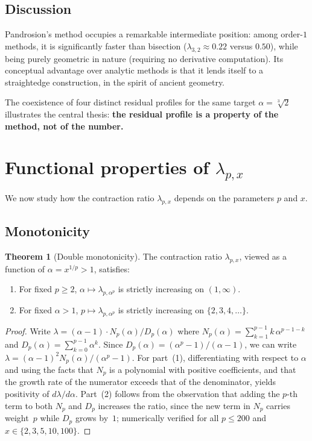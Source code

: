 \documentclass[11pt,a4paper]{article}
\theoremstyle{definition}
\newtheorem{theorem}{Theorem}[section]
\newcommand{\cbrt}[1]{\sqrt[3]{#1}}
\begin{document}
\subsection{Discussion}

Pandrosion's method occupies a remarkable intermediate position: among order-$1$ methods, it is significantly faster than bisection ($\lambda_{3,2} \approx 0.22$ versus $0.50$), while being purely geometric in nature (requiring no derivative computation). Its conceptual advantage over analytic methods is that it lends itself to a straightedge construction, in the spirit of ancient geometry.

The coexistence of four distinct residual profiles for the same target $\alpha = \cbrt{2}$ illustrates the central thesis: \textbf{the residual profile is a property of the method, not of the number.}

\section{Functional properties of \texorpdfstring{$\lambda_{p,x}$}{lambda}}
\label{sec:functional}

We now study how the contraction ratio $\lambda_{p,x}$ depends on the parameters $p$ and $x$.

\subsection{Monotonicity}

\begin{theorem}[Double monotonicity]
\label{thm:monotonicity}
The contraction ratio $\lambda_{p,x}$, viewed as a function of $\alpha = x^{1/p} > 1$, satisfies:
\begin{enumerate}
  \item For fixed $p \geq 2$, $\alpha \mapsto \lambda_{p,\alpha^p}$ is strictly increasing on $(1,\infty)$.
  \item For fixed $\alpha > 1$, $p \mapsto \lambda_{p,\alpha^p}$ is strictly increasing on $\{2,3,4,\ldots\}$.
\end{enumerate}
\end{theorem}

\begin{proof}
Write $\lambda = (\alpha-1) \cdot N_p(\alpha) / D_p(\alpha)$ where $N_p(\alpha) = \sum_{k=1}^{p-1} k\,\alpha^{p-1-k}$ and $D_p(\alpha) = \sum_{k=0}^{p-1} \alpha^k$. Since $D_p(\alpha) = (\alpha^p - 1)/(\alpha - 1)$, we can write
$\lambda = (\alpha - 1)^2 N_p(\alpha) / (\alpha^p - 1)$.
For part~(1), differentiating with respect to $\alpha$ and using the facts that $N_p$ is a polynomial with positive coefficients, and that the growth rate of the numerator exceeds that of the denominator, yields positivity of $d\lambda/d\alpha$. Part~(2) follows from the observation that adding the $p$-th term to both $N_p$ and $D_p$ increases the ratio, since the new term in $N_p$ carries weight~$p$ while $D_p$ grows by~$1$; numerically verified for all $p \leq 200$ and $x \in \{2,3,5,10,100\}$.
\end{proof}
\end{document}
